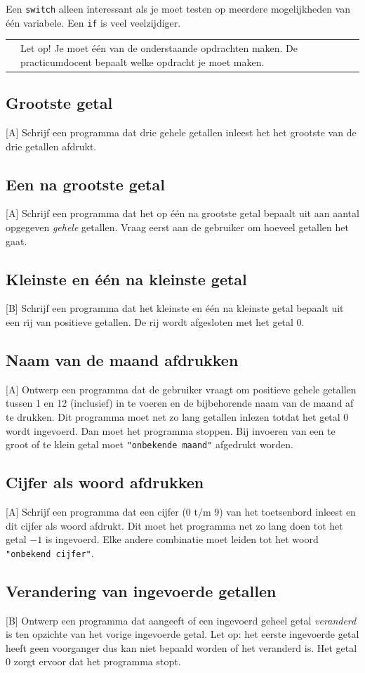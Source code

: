 \documentclass[a4paper,10pt,fleqn,twoside]{article}
\newcommand{\letop}{%
\vspace{4ex plus 1ex minus 1ex}
\begin{mdframed}[outerlinewidth = 1 ,%
roundcorner = 4 pt,%
leftmargin = 40,%
rightmargin = 40,%
backgroundcolor = yellow!40,%
outerlinecolor = red!70!black,%
innertopmargin = \topskip,%
splittopskip = \topskip,%
]
\begin{tabularx}{\linewidth}{m{1cm}X}
\Large\leftpointright & Let op! Je moet één van de onderstaande opdrachten maken. De practicumdocent bepaalt welke opdracht je moet maken.
\end{tabularx}
\end{mdframed}
\vspace{4ex plus 1ex minus 1ex}
}
\begin{document}
Een \lstinline|switch| alleen interessant als je moet testen op meerdere mogelijkheden van één variabele. Een \lstinline|if| is veel veelzijdiger.
 
\letop
\clearpage

\subsection{Grootste getal}[A]
Schrijf een programma dat drie gehele getallen inleest het het grootste van de drie getallen afdrukt. 

\subsection{Een na grootste getal}[A]
Schrijf een programma dat het op één na grootste getal bepaalt uit aan aantal opgegeven \textsl{gehele} getallen. Vraag eerst aan de gebruiker om hoeveel getallen het gaat.

\subsection{Kleinste en één na kleinste getal}[B]
Schrijf een programma dat het kleinste en één na kleinste getal bepaalt uit een rij van positieve getallen. De rij wordt afgesloten met het getal 0.

\subsection{Naam van de maand afdrukken}[A]
Ontwerp een programma dat de gebruiker vraagt om positieve gehele getallen tussen 1 en 12 (inclusief) in te voeren en de bijbehorende naam van de maand af te drukken. Dit programma moet net zo lang getallen inlezen totdat het getal 0 wordt ingevoerd. Dan moet het programma stoppen. Bij invoeren van een te groot of te klein getal moet \lstinline|"onbekende maand"| afgedrukt worden. 
 
\subsection{Cijfer als woord afdrukken}[A]
Schrijf een programma dat een cijfer (0 t/m 9) van het toetsenbord inleest en dit cijfer als woord afdrukt. Dit moet het programma net zo lang doen tot het getal $-1$ is ingevoerd. Elke andere combinatie moet leiden tot het woord \lstinline|"onbekend cijfer"|.
 
\subsection{Verandering van ingevoerde getallen}[B]
Ontwerp een programma dat aangeeft of een ingevoerd geheel getal \textsl{veranderd} is ten opzichte van het vorige ingevoerde getal. Let op: het eerste ingevoerde getal heeft geen voorganger dus kan niet bepaald worden of het veranderd is. Het getal 0 zorgt ervoor dat het programma stopt.
\end{document}
